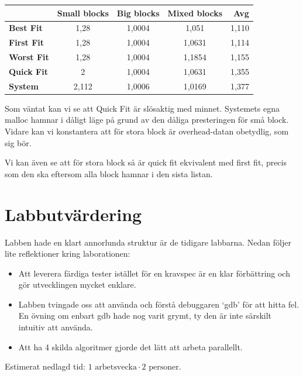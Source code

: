 \documentclass[a4paper,10pt,titlepage]{article}
\begin{document}
\begin{center}

	\begin{tabular}{ | >{\bfseries}l | c | c | c | r |}
		\hline
					& Small blocks	& Big blocks	& Mixed blocks	& Avg \\
		\hline
		Best Fit	& 1,28	& 1,0004	& 1,051		& 1,110 \\
		First Fit	& 1,28	& 1,0004	& 1,0631	& 1,114 \\
		Worst Fit	& 1,28	& 1,0004	& 1,1854	& 1,155 \\
		Quick Fit	& 2		& 1,0004	& 1,0631	& 1,355 \\
		System		& 2,112	& 1,0006	& 1,0169	& 1,377 \\
		\hline
	\end{tabular}
\end{center}

Som väntat kan vi se att Quick Fit är slösaktig med minnet. Systemets egna malloc hamnar i dåligt läge på grund av den dåliga presteringen för små block. Vidare kan vi konstantera att för stora block är overhead-datan obetydlig, som sig bör.

Vi kan även se att för stora block så är quick fit ekvivalent med first fit, precis som den ska eftersom alla block hamnar i den sista listan.



\newpage
\section{Labbutvärdering}

Labben hade en klart annorlunda struktur är de tidigare labbarna. Nedan följer lite reflektioner kring laborationen:

\begin{itemize}
	\item Att leverera färdiga tester istället för en kravspec är en klar förbättring och gör utvecklingen mycket enklare.
	\item Labben tvingade oss att använda och förstå debuggaren `gdb' för att hitta fel. En övning om enbart gdb hade nog varit grymt, ty den är inte särskilt intuitiv att använda.
	\item Att ha 4 skilda algoritmer gjorde det lätt att arbeta parallellt.
\end{itemize}

Estimerat nedlagd tid: $1 \text{ arbetsvecka} \cdot 2 \text{ personer}$.
\end{document}
